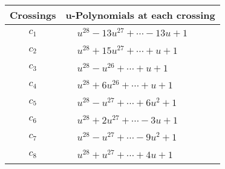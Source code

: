 \documentclass[1p]{elsarticle_modified}
\theoremstyle{definition}
\begin{document}
\begin{tabular}{m{50pt}|m{274pt}}
Crossings & \hspace{64pt}u-Polynomials at each crossing \\
\hline $$\begin{aligned}c_{1}\end{aligned}$$&$\begin{aligned}
&u^{28}-13 u^{27}+\cdots-13 u+1
\end{aligned}$\\
\hline $$\begin{aligned}c_{2}\end{aligned}$$&$\begin{aligned}
&u^{28}+15 u^{27}+\cdots+u+1
\end{aligned}$\\
\hline $$\begin{aligned}c_{3}\end{aligned}$$&$\begin{aligned}
&u^{28}- u^{26}+\cdots+u+1
\end{aligned}$\\
\hline $$\begin{aligned}c_{4}\end{aligned}$$&$\begin{aligned}
&u^{28}+6 u^{26}+\cdots+u+1
\end{aligned}$\\
\hline $$\begin{aligned}c_{5}\end{aligned}$$&$\begin{aligned}
&u^{28}- u^{27}+\cdots+6 u^2+1
\end{aligned}$\\
\hline $$\begin{aligned}c_{6}\end{aligned}$$&$\begin{aligned}
&u^{28}+2 u^{27}+\cdots-3 u+1
\end{aligned}$\\
\hline $$\begin{aligned}c_{7}\end{aligned}$$&$\begin{aligned}
&u^{28}- u^{27}+\cdots-9 u^2+1
\end{aligned}$\\
\hline $$\begin{aligned}c_{8}\end{aligned}$$&$\begin{aligned}
&u^{28}+u^{27}+\cdots+4 u+1
\end{aligned}$\\

\end{tabular}
\end{document}
